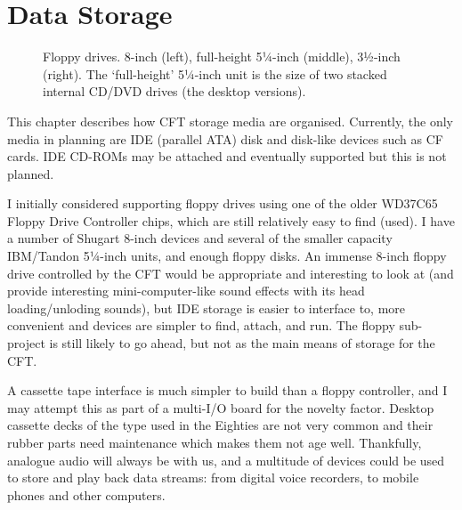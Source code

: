 



\chapter{Data Storage}
\label{sec:fs}


\begin{figure}
  \centering
  \caption[Floppy drives]{Floppy drives. 8-inch (left), full-height
    5¼-inch (middle), 3½-inch (right). The ‘full-height’ 5¼-inch unit
    is the size of two stacked internal CD/DVD drives (the desktop versions).}
\end{figure}


This chapter describes how CFT storage media are organised. Currently, the only
media in planning are IDE (parallel ATA) disk and disk-like devices such as CF
cards. IDE CD-ROMs may be attached and eventually supported but this is not
planned.

I initially considered supporting floppy drives using one of the older
WD37C65 Floppy Drive Controller chips, which are still relatively easy
to find (used). I have a number of Shugart 8-inch devices and several
of the smaller capacity IBM/Tandon 5¼-inch units, and enough floppy
disks. An immense 8-inch floppy drive controlled by the CFT would be
appropriate and interesting to look at (and provide interesting
mini-computer-like sound effects with its head loading/unloding
sounds), but IDE storage is easier to interface to, more convenient
and devices are simpler to find, attach, and run. The floppy
sub-project is still likely to go ahead, but not as the main means of
storage for the CFT.

A cassette tape interface is much simpler to build than a floppy
controller, and I may attempt this as part of a multi-I/O board for
the novelty factor. Desktop cassette decks of the type used in the
Eighties are not very common and their rubber parts need maintenance
which makes them not age well. Thankfully, analogue audio will always
be with us, and a multitude of devices could be used to store and play
back data streams: from digital voice recorders, to mobile phones and
other computers.

